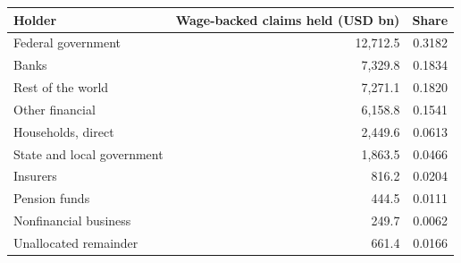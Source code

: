 \begin{tabular}{lrr}
\toprule
Holder & Wage-backed claims held (USD bn) & Share \\
\midrule
Federal government & 12,712.5 & 0.3182 \\
Banks & 7,329.8 & 0.1834 \\
Rest of the world & 7,271.1 & 0.1820 \\
Other financial & 6,158.8 & 0.1541 \\
Households, direct & 2,449.6 & 0.0613 \\
State and local government & 1,863.5 & 0.0466 \\
Insurers & 816.2 & 0.0204 \\
Pension funds & 444.5 & 0.0111 \\
Nonfinancial business & 249.7 & 0.0062 \\
Unallocated remainder & 661.4 & 0.0166 \\
\bottomrule
\end{tabular}
